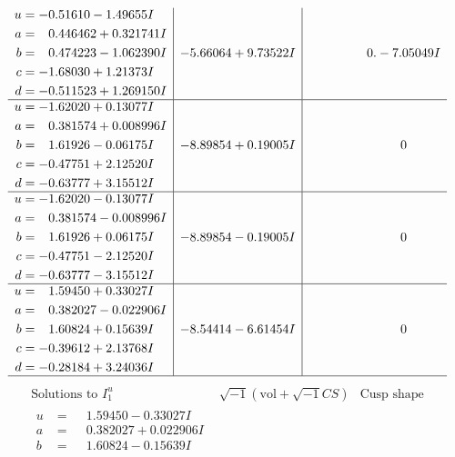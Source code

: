 \documentclass[1p]{elsarticle_modified}
\theoremstyle{definition}
\newcommand{\I}{\sqrt{-1}}
\begin{document}
$$\begin{array}{c|c|c}
\begin{aligned}
u &= -0.51610 - 1.49655 I \\
a &= \phantom{-}0.446462 + 0.321741 I \\
b &= \phantom{-}0.474223 - 1.062390 I \\
c &= -1.68030 + 1.21373 I \\
d &= -0.511523 + 1.269150 I\end{aligned}
 & -5.66064 + 9.73522 I & \phantom{-0.000000 } 0. - 7.05049 I \\ \hline\begin{aligned}
u &= -1.62020 + 0.13077 I \\
a &= \phantom{-}0.381574 + 0.008996 I \\
b &= \phantom{-}1.61926 - 0.06175 I \\
c &= -0.47751 + 2.12520 I \\
d &= -0.63777 + 3.15512 I\end{aligned}
 & -8.89854 + 0.19005 I & \phantom{-0.000000 } 0 \\ \hline\begin{aligned}
u &= -1.62020 - 0.13077 I \\
a &= \phantom{-}0.381574 - 0.008996 I \\
b &= \phantom{-}1.61926 + 0.06175 I \\
c &= -0.47751 - 2.12520 I \\
d &= -0.63777 - 3.15512 I\end{aligned}
 & -8.89854 - 0.19005 I & \phantom{-0.000000 } 0 \\ \hline\begin{aligned}
u &= \phantom{-}1.59450 + 0.33027 I \\
a &= \phantom{-}0.382027 - 0.022906 I \\
b &= \phantom{-}1.60824 + 0.15639 I \\
c &= -0.39612 + 2.13768 I \\
d &= -0.28184 + 3.24036 I\end{aligned}
 & -8.54414 - 6.61454 I & \phantom{-0.000000 } 0\\
 \hline 
 \end{array}$$\newpage$$\begin{array}{c|c|c}  
\text{Solutions to }I^u_{1}& \I (\text{vol} + \sqrt{-1}CS) & \text{Cusp shape}\\
 \hline 
\begin{aligned}
u &= \phantom{-}1.59450 - 0.33027 I \\
a &= \phantom{-}0.382027 + 0.022906 I \\
b &= \phantom{-}1.60824 - 0.15639 I \\

\end{aligned}
\end{array}$$
\end{document}
